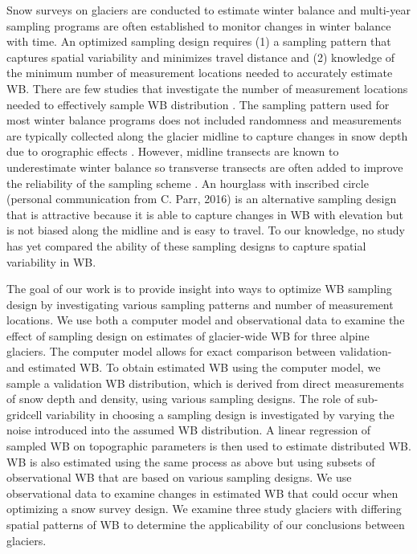 \documentclass[twocolumn,letterpaper]{igs}
\begin{document}
Snow surveys on glaciers are conducted to estimate winter balance and multi-year sampling programs are often established to monitor changes in winter balance with time. An optimized sampling design requires (1) a sampling pattern that captures spatial variability and minimizes travel distance and (2) knowledge of the minimum number of measurement locations needed to accurately estimate WB. There are few studies that investigate the number of measurement locations needed to effectively sample WB distribution \citep[c.f.][]{Fountain1999,Walmsley2015}. The sampling pattern used for most winter balance programs does not included randomness and measurements are typically collected along the glacier midline \citep[e.g.][]{Kaser2003} to capture changes in snow depth due to orographic effects \citep[e.g.][]{Grunewald2014}. However, midline transects are known to underestimate winter balance so transverse transects are often added to improve the reliability of the sampling scheme \citep[e.g.][]{Walmsley2015}. An hourglass with inscribed circle (personal communication from C. Parr, 2016) is an alternative sampling design that is attractive because it is able to capture changes in WB with elevation but is not biased along the midline and is easy to travel. To our knowledge, no study has yet compared the ability of these sampling designs to capture spatial variability in WB.  

The goal of our work is to provide insight into ways to optimize WB sampling design by investigating various sampling patterns and number of measurement locations. We use both a computer model and observational data to examine the effect of sampling design on estimates of glacier-wide WB for three alpine glaciers. The computer model allows for exact comparison between validation- and estimated WB. To obtain estimated WB using the computer model, we sample a validation WB distribution, which is derived from direct measurements of snow depth and density, using various sampling designs. The role of sub-gridcell variability in choosing a sampling design is investigated by varying the noise introduced into the assumed WB distribution. A linear regression of sampled WB on topographic parameters is then used to estimate distributed WB. WB is also estimated using the same process as above but using subsets of observational WB that are based on various sampling designs. We use observational data to examine changes in estimated WB that could occur when optimizing a snow survey design. We examine three study glaciers with differing spatial patterns of WB to determine the applicability of our conclusions between glaciers. 
\end{document}
